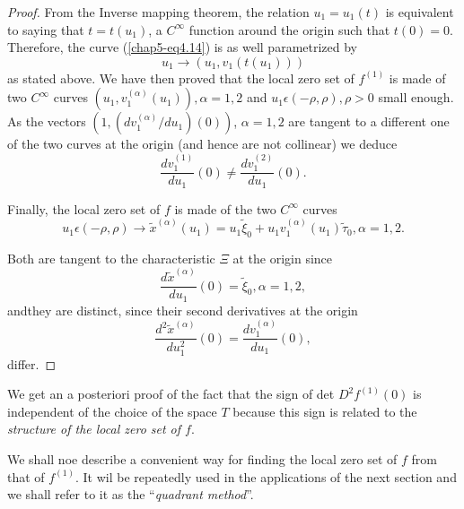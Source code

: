 \begin{proof}
From the Inverse mapping theorem, the relation $u_{1} = u_{1}(t)$ is
equivalent to saying that $t = t(u_{1})$, a $C^{\infty}$ function
around the origin such that $t(0) = 0$. Therefore, the curve
(\ref{chap5-eq4.14}) is as well parametrized by
$$
u_{1} \to (u_{1}, v_{1}(t(u_{1})))
$$
as stated above. We have then proved that the local zero set of
$f^{(1)}$ is made of two $C^{\infty}$ curves $(u_{1}, v_{1}^{(\alpha)}
(u_{1})), \alpha = 1, 2$ and $u_{1} \epsilon (-\rho, \rho), \rho > 0$
small enough. As the vectors $(1, (dv_{1}^{(\alpha)} / du_{1})(0))$,
$\alpha = 1, 2$ are tangent to a different one of the two curves at
the origin (and hence are not collinear) we deduce
$$
\frac{dv_{1}^{(1)}}{du_{1}} (0) \neq \frac{dv_{1}^{(2)}}{du_{1}} (0).
$$

Finally, the local zero set of $f$ is made of the two $C^{\infty}$
curves
$$
u_{1} \epsilon (-\rho, \rho) \to \widetilde{x}^{(\alpha)}(u_{1}) =
u_{1}\widetilde{\xi}_{0} + u_{1}v_{1}^{(\alpha)} (u_{1})
\widetilde{\tau}_{0}, \alpha = 1, 2.
$$

Both are tangent to the characteristic $\Xi$ at the origin since
$$
\frac{d\widetilde{x}^{(\alpha)}}{du_{1}} (0) = \widetilde{\xi}_{0},
\alpha = 1, 2,
$$
and\pageoriginale they are distinct, since their second derivatives at
the origin
$$
\frac{d^{2} \widetilde{x}^{(\alpha)}}{du_{1}^{2}} (0) =
\frac{dv_{1}^{(\alpha)}}{du_{1}} (0), 
$$
differ.
\end{proof}

\begin{remark}\label{chap5-rem4.3}
We get an a posteriori proof of the fact that the sign of det
$D^{2}f^{(1)} (0)$ is independent of the choice of the space $T$ because
this sign is related to the {\em structure of the local zero set of $f$}.
\end{remark}

We shall noe describe a convenient way for finding the local zero set
of $f$ from that of $f^{(1)}$. It wil be repeatedly used in the
applications of the next section and we shall refer to it as the
``{\em quadrant method}''.

